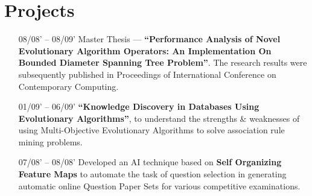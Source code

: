 \documentclass{article}
\begin{document}
\section{Projects}
\begin{itemize}[leftmargin=-1ex]\setlength\itemsep{0.25em}\vspace{5pt}
   \item[08/08' – 08/09'] Master Thesis  --- \textbf{``Performance Analysis of Novel Evolutionary Algorithm Operators: An Implementation On Bounded Diameter Spanning Tree Problem''}. The research results were subsequently published in Proceedings of International Conference on Contemporary Computing.
    \item[01/09' – 06/09'] \textbf{``Knowledge Discovery in Databases Using Evolutionary Algorithms''}, to understand the strengths \& weaknesses of using Multi-Objective Evolutionary Algorithms to solve association rule mining problems.
   \item[07/08' – 08/08']  Developed an AI technique based on \textbf{Self Organizing Feature Maps} to automate the task of question selection in generating automatic online Question Paper Sets for various competitive examinations.
\end{itemize}
\end{document}
